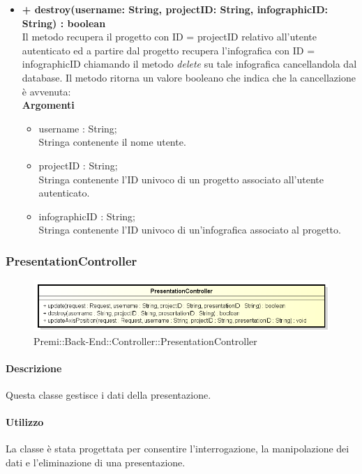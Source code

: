 \begin{itemize}
			\item \textbf{+ destroy(username: String, projectID: String, infographicID: String) : boolean}\\
			Il metodo recupera il progetto con ID = projectID relativo all'utente autenticato ed a partire dal progetto recupera l'\gls{infografica} con ID = infographicID chiamando il metodo \textit{delete} su tale \gls{infografica} cancellandola dal \gls{database}. Il metodo ritorna un valore booleano che indica che la cancellazione è avvenuta:\\
			\textbf{Argomenti}
			\begin{itemize}
				\item username : String; \\
				Stringa contenente il nome utente.
				\item projectID : String; \\
				Stringa contenente l'ID univoco di un progetto associato all'utente autenticato.
				\item infographicID : String; \\
				Stringa contenente l'ID univoco di un'\gls{infografica} associato al progetto.
			\end{itemize}
		\end{itemize}
		
\newpage
\subsubsection{PresentationController}
\begin{figure}[h]
\centering
\includegraphics[width=0.8\linewidth]{img/back_end_http_controllers_presentationController}
\caption[Premi::Back-End::Controller::PresentationController]{Premi::Back-End::Controller::PresentationController}
\end{figure}


	\paragraph{Descrizione}
		Questa classe gestisce i dati della presentazione.
	\paragraph{Utilizzo}
		La classe è stata progettata per consentire l'interrogazione, la manipolazione dei dati e l'eliminazione di una presentazione.
	

